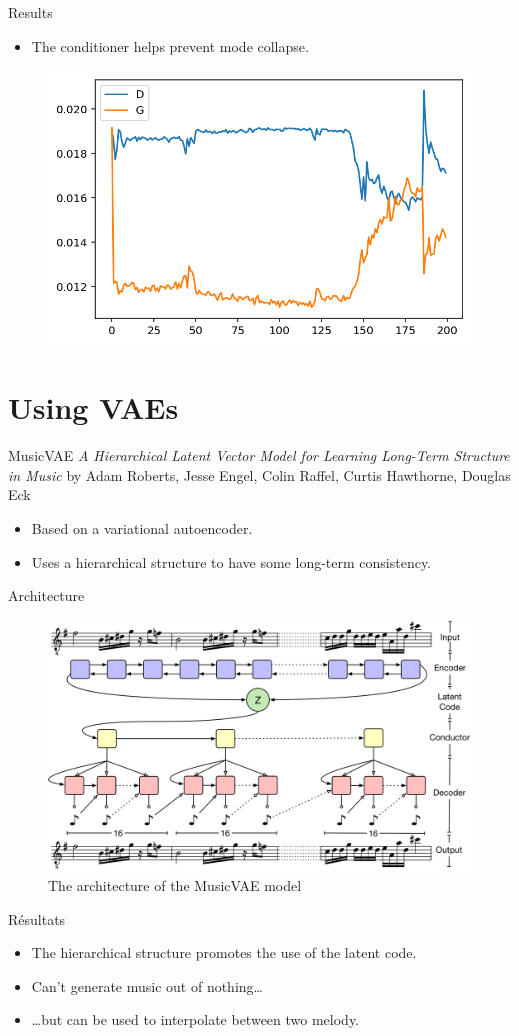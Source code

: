 \documentclass{beamer}
\begin{document}
\begin{frame}{Results}
\begin{itemize}
	\item The conditioner helps prevent mode collapse.
\end{itemize}
\begin{figure}[h]
\centering
\includegraphics[width=0.6\linewidth]{loss_midinet_w_cond}
\end{figure}
\end{frame}

\section{Using VAEs}
\begin{frame}{MusicVAE}
\textit{A Hierarchical Latent Vector Model for Learning Long-Term Structure in Music}
by Adam Roberts, Jesse Engel, Colin Raffel, Curtis Hawthorne, Douglas Eck
\begin{itemize}
	\item Based on a variational autoencoder.
	\item Uses a hierarchical structure to have some long-term consistency.
\end{itemize}
\end{frame}

\begin{frame}{Architecture}
\begin{figure}[h]
\centering
\includegraphics[width=\linewidth]{musicVAE}
\caption{The architecture of the MusicVAE model}
\end{figure}
\end{frame}

\begin{frame}{Résultats}
\begin{itemize}
	\item The hierarchical structure promotes the use of the latent code.
	\item Can't generate music out of nothing\dots
	\item \dots but can be used to interpolate between two melody.
\end{itemize}
\end{frame}
\end{document}
